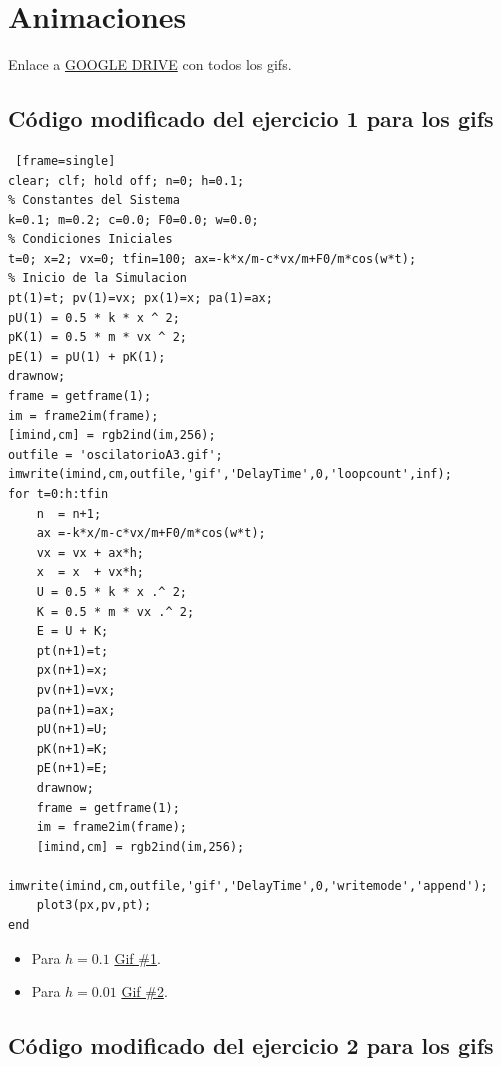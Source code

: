 \documentclass{article}
\begin{document}
\section{Animaciones}

Enlace a \textcolor{blue}{\href{https://drive.google.com/drive/folders/1uHIAViRx4Gnbq0uHUR8HpsFWhjvJ8CsG?usp=sharing}{GOOGLE DRIVE}} con todos los gifs.

\subsection{Código modificado del ejercicio 1 para los gifs}

\begin{lstlisting} [frame=single]
clear; clf; hold off; n=0; h=0.1;
% Constantes del Sistema
k=0.1; m=0.2; c=0.0; F0=0.0; w=0.0;
% Condiciones Iniciales
t=0; x=2; vx=0; tfin=100; ax=-k*x/m-c*vx/m+F0/m*cos(w*t);
% Inicio de la Simulacion
pt(1)=t; pv(1)=vx; px(1)=x; pa(1)=ax;
pU(1) = 0.5 * k * x ^ 2;
pK(1) = 0.5 * m * vx ^ 2;
pE(1) = pU(1) + pK(1);
drawnow;
frame = getframe(1);
im = frame2im(frame);        
[imind,cm] = rgb2ind(im,256);       
outfile = 'oscilatorioA3.gif';
imwrite(imind,cm,outfile,'gif','DelayTime',0,'loopcount',inf);
for t=0:h:tfin
    n  = n+1;
    ax =-k*x/m-c*vx/m+F0/m*cos(w*t);
    vx = vx + ax*h;
    x  = x  + vx*h;
    U = 0.5 * k * x .^ 2;
    K = 0.5 * m * vx .^ 2;
    E = U + K;
    pt(n+1)=t;
    px(n+1)=x;
    pv(n+1)=vx;
    pa(n+1)=ax;
    pU(n+1)=U;
    pK(n+1)=K;
    pE(n+1)=E;
    drawnow;
    frame = getframe(1);
    im = frame2im(frame);        
    [imind,cm] = rgb2ind(im,256);       
    imwrite(imind,cm,outfile,'gif','DelayTime',0,'writemode','append');
    plot3(px,pv,pt);
end
\end{lstlisting}

\begin{itemize}
    \item Para $h=0.1$ \textcolor{blue}{
    \href{https://drive.google.com/file/d/1WXkhg7N2HJBfWSU8vckPY2pPMvStEJgV/view?usp=sharing}{Gif \#1}}.
    \item Para $h=0.01$ \textcolor{blue}{
    \href{https://drive.google.com/file/d/1vKKF7YbgDsOPVjdOpqd4qbmjKXZh8aB2/view?usp=sharing}{Gif \#2}}.
\end{itemize}

\subsection{Código modificado del ejercicio 2 para los gifs}
\end{document}
